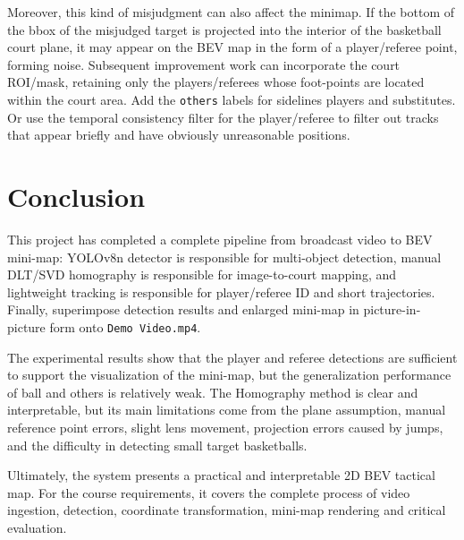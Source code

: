 \documentclass[12pt,a4paper]{article}
\begin{document}
Moreover, this kind of misjudgment can also affect the minimap. If the bottom of the bbox of the misjudged target is projected into the interior of the basketball court plane, it may appear on the BEV map in the form of a player/referee point, forming noise. Subsequent improvement work can incorporate the court ROI/mask, retaining only the players/referees whose foot-points are located within the court area. Add the \texttt{others} labels for sidelines players and substitutes. Or use the temporal consistency filter for the player/referee to filter out tracks that appear briefly and have obviously unreasonable positions.

\section{Conclusion}

This project has completed a complete pipeline from broadcast video to BEV mini-map: YOLOv8n detector is responsible for multi-object detection, manual DLT/SVD homography is responsible for image-to-court mapping, and lightweight tracking is responsible for player/referee ID and short trajectories. Finally, superimpose detection results and enlarged mini-map in picture-in-picture form onto \texttt{Demo Video.mp4}.

The experimental results show that the player and referee detections are sufficient to support the visualization of the mini-map, but the generalization performance of ball and others is relatively weak. The Homography method is clear and interpretable, but its main limitations come from the plane assumption, manual reference point errors, slight lens movement, projection errors caused by jumps, and the difficulty in detecting small target basketballs.

Ultimately, the system presents a practical and interpretable 2D BEV tactical map. For the course requirements, it covers the complete process of video ingestion, detection, coordinate transformation, mini-map rendering and critical evaluation.

\newpage
\printbibliography
\end{document}
